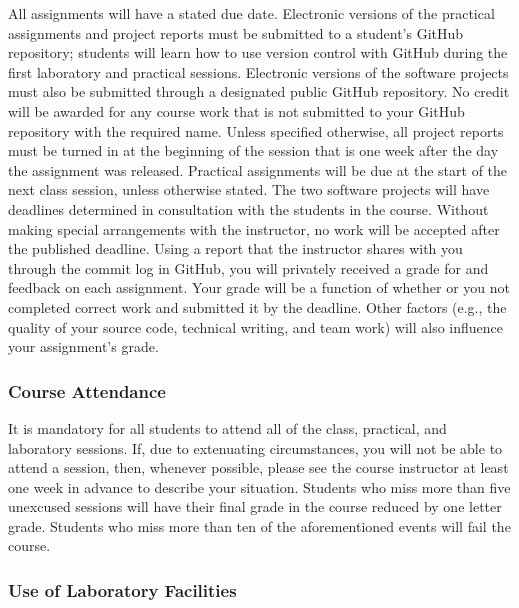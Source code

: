 \documentclass[11pt]{article}
\begin{document}
All assignments will have a stated due date. Electronic versions of the
practical assignments and project reports must be submitted to a student's
GitHub repository; students will learn how to use version control with GitHub
during the first laboratory and practical sessions. Electronic versions of the
software projects must also be submitted through a designated public GitHub
repository. No credit will be awarded for any course work that is not submitted
to your GitHub repository with the required name.
%
Unless specified otherwise, all project reports must be turned in at the
beginning of the session that is one week after the day the assignment was
released. Practical assignments will be due at the start of the next class
session, unless otherwise stated. The two software projects will have deadlines
determined in consultation with the students in the course. Without making
special arrangements with the instructor, no work will be accepted after the
published deadline.
%
Using a report that the instructor shares with you through the commit log in
GitHub, you will privately received a grade for and feedback on each assignment.
Your grade will be a function of whether or you not completed correct work and
submitted it by the deadline. Other factors (e.g., the quality of your source
code, technical writing, and team work) will also influence your assignment's
grade.

\vspace*{-.1in}

\subsubsection*{Course Attendance}

It is mandatory for all students to attend all of the class, practical, and
laboratory sessions. If, due to extenuating circumstances, you will not be able
to attend a session, then, whenever possible, please see the course instructor
at least one week in advance to describe your situation. Students who miss more
than five unexcused sessions will have their final grade in the course reduced
by one letter grade. Students who miss more than ten of the aforementioned
events will fail the course.

\vspace*{-.05in}

\subsubsection*{Use of Laboratory Facilities}
\end{document}
